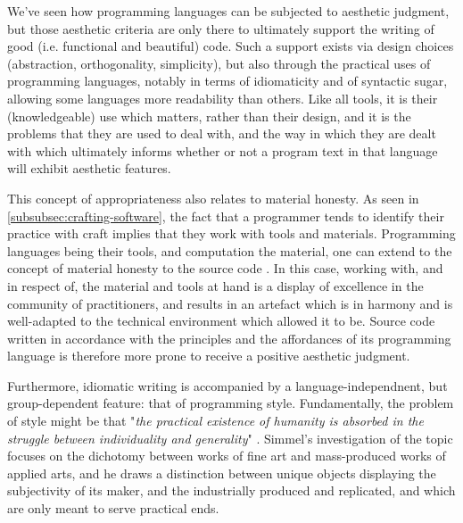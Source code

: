We've seen how programming languages can be subjected to aesthetic judgment, but those aesthetic criteria are only there to ultimately support the writing of good (i.e. functional and beautiful) code. Such a support exists via design choices (abstraction, orthogonality, simplicity), but also through the practical uses of programming languages, notably in terms of idiomaticity and of syntactic sugar, allowing some languages more readability than others. Like all tools, it is their (knowledgeable) use which matters, rather than their design, and it is the problems that they are used to deal with, and the way in which they are dealt with which ultimately informs whether or not a program text in that language will exhibit aesthetic features.

This concept of appropriateness also relates to material honesty. As seen in \ref{subsubsec:crafting-software}, the fact that a programmer tends to identify their practice with craft implies that they work with tools and materials. Programming languages being their tools, and computation the material, one can extend to the concept of material honesty to the source code \citep{sennett_craftsman_2009}. In this case, working with, and in respect of, the material and tools at hand is a display of excellence in the community of practitioners, and results in an artefact which is in harmony and is well-adapted to the technical environment which allowed it to be. Source code written in accordance with the principles and the affordances of its programming language is therefore more prone to receive a positive aesthetic judgment.

Furthermore, idiomatic writing is accompanied by a language-independnent, but group-dependent feature: that of programming style. Fundamentally, the problem of style might be that "\emph{the practical existence of humanity is absorbed in the struggle between individuality and generality}" \citep{simmel_problem_1991}. Simmel's investigation of the topic focuses on the dichotomy between works of fine art and mass-produced works of applied arts, and he draws a distinction between unique objects displaying the subjectivity of its maker, and  the industrially produced and replicated, and which are only meant to serve practical ends.

